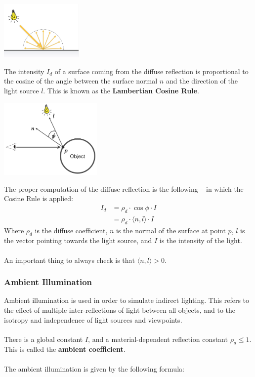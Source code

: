 \documentclass{article}
\begin{document}
\begin{center}
	\includegraphics[width=4cm]{lambertian_surf.png}
\end{center}
The intensity $I_d$ of a surface coming from the diffuse reflection is proportional to the cosine of the angle between the surface normal $n$ and the direction of the light source $l$. This is known as the \textbf{Lambertian Cosine Rule}.

\begin{center}
	\includegraphics[width=5cm]{cos_rule.png}
\end{center}
The proper computation of the diffuse reflection is the following -- in which the Cosine Rule is applied:
\begin{align*}
	I_d &= \rho_d \cdot \cos\phi \cdot I \\
	&= \rho_d \cdot \langle n, l \rangle \cdot I
\end{align*}
Where $\rho_d$ is the diffuse coefficient, $n$ is the normal of the surface at point $p$, $l$ is the vector pointing towards the light source, and $I$ is the intensity of the light. \\ \\
An important thing to always check is that $\langle n, l \rangle > 0$.

\subsubsection{Ambient Illumination}
Ambient illumination is used in order to simulate indirect lighting. This refers to the effect of multiple inter-reflections of light between all objects, and to the isotropy and independence of light sources and viewpoints. \\ \\
There is a global constant $I$, and a material-dependent reflection constant $\rho_a \leq 1$. This is called the \textbf{ambient coefficient}. \\ \\
The ambient illumination is given by the following formula:
\end{document}
